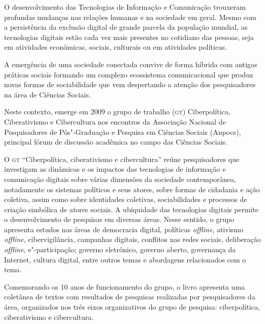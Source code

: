 

\noindent{}O desenvolvimento das Tecnologias de Informação e Comunicação trouxeram
profundas mudanças nas relações humanas e na sociedade em geral. Mesmo
com a persistência da exclusão digital de grande parcela da população
mundial, as tecnologias digitais estão cada vez mais presentes no
cotidiano das pessoas, seja em atividades econômicas, sociais, culturais
ou em atividades políticas.

A emergência de uma sociedade conectada convive de forma híbrida com
antigas práticas sociais formando um complexo ecossistema comunicacional
que produz novas formas de sociabilidade que vem despertando a atenção
dos pesquisadores na área de Ciências Sociais.

Neste contexto, emerge em 2009 o grupo de trabalho (\textsc{gt}) Ciberpolítica,
Ciberativismo e Cibercultura nos encontros da Associação Nacional de
Pesquisadores de Pós"-Graduação e Pesquisa em Ciências Sociais (Anpocs),
principal fórum de discussão acadêmica no campo das Ciências Sociais.

O \textsc{gt} ``Ciberpolítica, ciberativismo e cibercultura'' reúne pesquisadores
que investigam as dinâmicas e os impactos das tecnologias de informação
e comunicação digitais sobre várias dimensões da sociedade
contemporânea, notadamente os sistemas políticos e seus atores, sobre
formas de cidadania e ação coletiva, assim como sobre identidades
coletivas, sociabilidades e processos de criação simbólica de atores
sociais. A ubiquidade das tecnologias digitais permite o desenvolvimento
de pesquisas em diversas áreas. Nesse sentido, o grupo apresenta estudos
nas áreas de democracia digital, políticas \emph{offline}, ativismo \emph{offline},
cibervigilância, campanhas digitais, conflitos nas redes sociais,
deliberação \emph{offline}, e"-participação; governo eletrônico, governo aberto,
governança da Internet, cultura digital, entre outros temas e abordagens
relacionados com o tema.

Comemorando os 10 anos de funcionamento do grupo, o livro apresenta uma
coletânea de textos com resultados de pesquisas realizadas por
pesquisadores da área, organizados nos três eixos organizativos do grupo
de pesquisa: ciberpolítica, ciberativismo e cibercultura.

